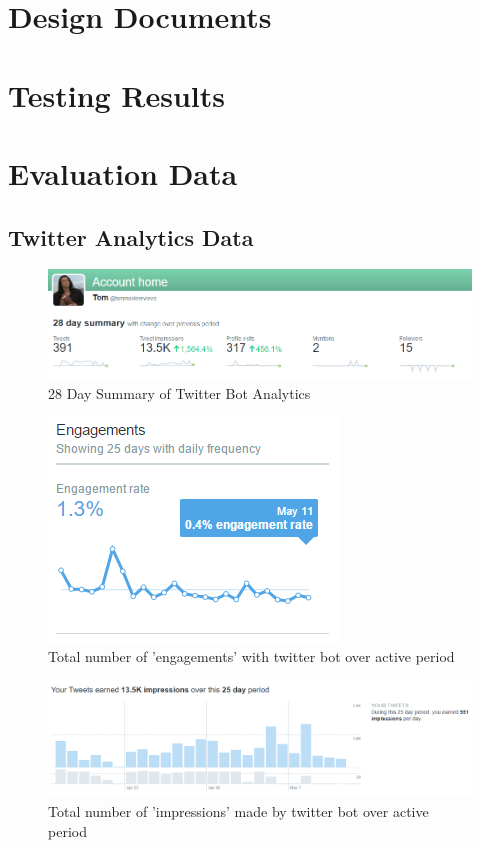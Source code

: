 \section{Design Documents}
\section{Testing Results}

\section{Evaluation Data}
\subsection{Twitter Analytics Data}


\begin{figure}
\centering
\includegraphics[width=0.7\linewidth]{figures/twitter_analytics/28daysummary}
\caption{28 Day Summary of Twitter Bot Analytics}
\label{fig:28daysummary}
\end{figure}
\begin{figure}
\centering
\includegraphics[width=0.7\linewidth]{figures/twitter_analytics/engagements}
\caption{Total number of 'engagements' with twitter bot over active period}
\label{fig:engagements}
\end{figure}
\begin{figure}
\centering
\includegraphics[width=0.7\linewidth]{figures/twitter_analytics/impressions}
\caption{Total number of 'impressions' made by twitter bot over active period}
\label{fig:impressions}
\end{figure}
